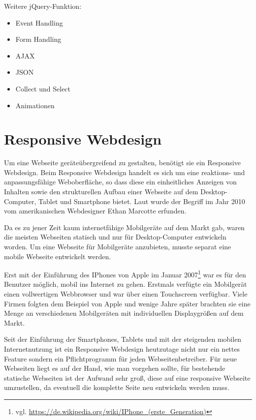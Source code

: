 \newpage
Weitere jQuery-Funktion:
\begin{itemize}
\item Event Handling
\item Form Handling
\item AJAX
\item JSON
\item Collect und Select
\item Animationen
\end{itemize}

\section{Responsive Webdesign}
\label{sec:responsive webdesign}
Um eine Webseite geräteübergreifend zu gestalten, benötigt sie ein \glqq Responsive Webdesign\grqq{}. Beim Responsive Webdesign handelt es sich um eine reaktions- und anpassungsfähige Weboberfläche, so dass diese ein einheitliches Anzeigen von Inhalten sowie den strukturellen Aufbau einer Webseite auf dem Desktop-Computer, Tablet und Smartphone bietet. Laut \cite{Wiki2019c} wurde der Begriff im Jahr 2010 vom amerikanischen Webdesigner Ethan Marcotte erfunden.\bigskip

Da es zu jener Zeit kaum internetfähige Mobilgeräte auf dem Markt gab, waren die meisten Webseiten statisch und nur für Desktop-Computer entwickeln worden. Um eine Webseite für Mobilgeräte anzubieten, musste separat eine mobile Webseite entwickelt werden.\bigskip

Erst mit der Einführung des IPhones von Apple im Januar 2007\footnote{vgl. \url{https://de.wikipedia.org/wiki/IPhone_(erste_Generation)}} war es für den Benutzer möglich, mobil ins Internet zu gehen. Erstmals verfügte ein Mobilgerät einen vollwertigen Webbrowser und war über einen Touchscreen verfügbar. Viele Firmen folgten dem Beispiel von Apple und wenige Jahre später brachten sie eine Menge an verschiedenen Mobilgeräten mit individuellen Displaygrößen auf dem Markt.\bigskip

Seit der Einführung der Smartphones, Tablets und mit der steigenden mobilen Internetnutzung ist ein Responsive Webdesign heutzutage nicht nur ein nettes Feature sondern ein Pflichtprogramm für jeden Webseitenbetreiber. Für neue Webseiten liegt es auf der Hand, wie man vorgehen sollte, für bestehende statische Webseiten ist der Aufwand sehr groß, diese auf eine responsive Webseite umzustellen, da eventuell die komplette Seite neu entwickeln werden muss.\bigskip

